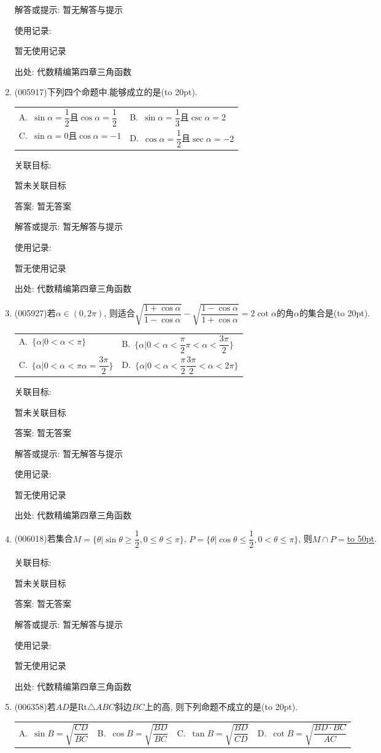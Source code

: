 \documentclass[10pt,a4paper]{article}
\newcommand{\blank}[1]{\underline{\hbox to #1pt{}}}
\newcommand{\bracket}[1]{(\hbox to #1pt{})}
\newcommand{\twoch}[4]{\par\begin{tabular}{p{.46\textwidth}p{.46\textwidth}}
A.~#1& B.~#2\\
C.~#3& D.~#4
\end{tabular}}
\newcommand{\fourch}[4]{\par\begin{tabular}{p{.23\textwidth}p{.23\textwidth}p{.23\textwidth}p{.23\textwidth}}
A.~#1 &B.~#2& C.~#3& D.~#4
\end{tabular}}
\begin{document}
\begin{enumerate}[1.]
解答或提示: 暂无解答与提示

使用记录:

暂无使用记录


出处: 代数精编第四章三角函数
\item { (005917)}下列四个命题中.能够成立的是\bracket{20}.
\twoch{$\sin \alpha =\dfrac 12$且$\cos \alpha =\dfrac 12$}{$\sin \alpha =\dfrac 13$且$\csc \alpha =2$}{$\sin \alpha =0$且$\cos \alpha =-1$}{$\cos \alpha =\dfrac 12$且$\sec \alpha =-2$}


关联目标:

暂未关联目标

答案: 暂无答案

解答或提示: 暂无解答与提示

使用记录:

暂无使用记录


出处: 代数精编第四章三角函数
\item { (005927)}若$\alpha \in (0,2\pi)$, 则适合$\sqrt {\dfrac{1+\cos \alpha}{1-\cos \alpha}}-\sqrt {\dfrac{1-\cos \alpha}{1+\cos \alpha}}=2\cot \alpha$的角$\alpha$的集合是\bracket{20}.
\twoch{$\{\alpha|0<\alpha <\pi\}$}{$\{\alpha|0<\alpha <\dfrac{\pi}2\pi <\alpha <\dfrac{3\pi}2\}$}{$\{\alpha|0<\alpha <\pi \alpha =\dfrac{3\pi}2\}$}{$\{\alpha|0<\alpha <\dfrac{\pi}2\dfrac{3\pi}2<\alpha <2\pi\}$}


关联目标:

暂未关联目标

答案: 暂无答案

解答或提示: 暂无解答与提示

使用记录:

暂无使用记录


出处: 代数精编第四章三角函数
\item { (006018)}若集合$M=\{\theta|\sin \theta \ge \dfrac 12,0\le \theta \le \pi\}$, $P=\{\theta|\cos \theta \le \dfrac 12,0<\theta \le \pi\}$, 则$M\cap P=$\blank{50}.


关联目标:

暂未关联目标

答案: 暂无答案

解答或提示: 暂无解答与提示

使用记录:

暂无使用记录


出处: 代数精编第四章三角函数
\item { (006358)}若$AD$是Rt$\triangle ABC$斜边$BC$上的高, 则下列命题不成立的是\bracket{20}.
\fourch{$\sin B=\sqrt {\dfrac{CD}{BC}}$}{$\cos B=\sqrt {\dfrac{BD}{BC}}$}{$\tan B=\sqrt {\dfrac{BD}{CD}}$}{$\cot B=\sqrt {\dfrac{BD\cdot BC}{AC}}$}



\end{enumerate}
\end{document}
